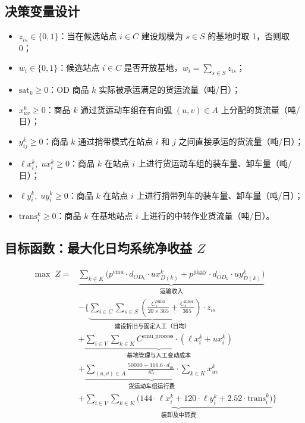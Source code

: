 \documentclass[12pt,a4paper,fontset=none]{ctexart}
\begin{document}
\subsection{决策变量设计}

\begin{itemize}[leftmargin=*]
    \item $z_{is} \in \{0, 1\}$：当在候选站点 $i \in C$ 建设规模为 $s \in S$ 的基地时取 1，否则取 0；
    \item $w_i \in \{0, 1\}$：候选站点 $i \in C$ 是否开放基地，$w_i = \sum_{s \in S} z_{is}$；
    \item $\text{sat}_k \geq 0$：OD 商品 $k$ 实际被承运满足的货运流量（吨/日）；
    \item $x_{uv}^k \geq 0$：商品 $k$ 通过货运动车组在有向弧 $(u,v) \in A$ 上分配的货流量（吨/日）；
    \item $y_{ij}^k \geq 0$：商品 $k$ 通过捎带模式在站点 $i$ 和 $j$ 之间直接承运的货流量（吨/日）；
    \item $\ell x_i^k,\; ux_i^k \geq 0$：商品 $k$ 在站点 $i$ 上进行货运动车组的装车量、卸车量（吨/日）；
    \item $\ell y_i^k,\; uy_i^k \geq 0$：商品 $k$ 在站点 $i$ 上进行捎带列车的装车量、卸车量（吨/日）；
    \item $\text{trans}_i^k \geq 0$：商品 $k$ 在基地站点 $i$ 上进行的中转作业货流量（吨/日）。
\end{itemize}

\subsection{目标函数：最大化日均系统净收益 $Z$}

\begin{align}
\max\; Z = &\underbrace{\sum_{k \in K} \Big( p^{\text{emu}} \cdot d_{OD_k} \cdot ux_{D(k)}^k + p^{\text{piggy}} \cdot d_{OD_k} \cdot uy_{D(k)}^k \Big)}_{\text{运输收入}} \nonumber\\
& - \Bigg\{ \underbrace{\sum_{i \in C} \sum_{s \in S} \left( \frac{C_s^{\text{build}}}{20 \times 365} + \frac{C_s^{\text{labor}}}{365} \right) \cdot z_{is}}_{\text{建设折旧与固定人工（日均）}} \nonumber\\
& + \underbrace{\sum_{i \in V} \sum_{k \in K} C^{\text{emu\_process}} \cdot (\ell x_i^k + ux_i^k)}_{\text{基地管理与人工变动成本}} \nonumber\\
& + \underbrace{\sum_{(u,v) \in A} \frac{50000 + 116.6 \cdot d_{uv}}{85} \cdot \sum_{k \in K} x_{uv}^k}_{\text{货运动车组运行费}} \nonumber\\
& + \underbrace{\sum_{i \in V} \sum_{k \in K} \Big( 144 \cdot \ell x_i^k + 120 \cdot \ell y_i^k + 2.52 \cdot \text{trans}_i^k \Big)}_{\text{装卸及中转费}} \Bigg\}
\end{align}
\end{document}
